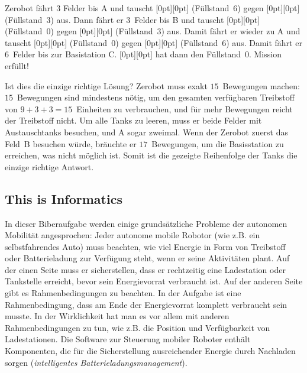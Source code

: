 \documentclass[a4paper,11pt]{report}
\newcommand{\taskGraphicsFolder}{..}
\begin{document}
Zerobot fährt $3$ Felder bis A und tauscht \raisebox{-0.5ex}[0pt][0pt]{} (Füllstand~$6$) gegen \raisebox{-0.5ex}[0pt][0pt]{} (Füllstand~$3$) aus. Dann fährt er $3$~Felder bis B und tauscht \raisebox{-0.5ex}[0pt][0pt]{} (Füllstand~$0$) gegen \raisebox{-0.5ex}[0pt][0pt]{} (Füllstand~$3$) aus. Damit fährt er wieder zu A und tauscht \raisebox{-0.5ex}[0pt][0pt]{} (Füllstand~$0$) gegen \raisebox{-0.5ex}[0pt][0pt]{} (Füllstand~$6$) aus. Damit fährt er $6$~Felder bis zur Basistation C. \raisebox{-0.5ex}[0pt][0pt]{} hat dann den Füllstand~$0$. Mission erfüllt!

Ist dies die einzige richtige Lösung? Zerobot muss exakt $15$~Bewegungen machen: $15$~Bewegungen sind mindestens nötig, um den gesamten verfügbaren Treibstoff von ${9 + 3 + 3 = 15}$~Einheiten zu verbrauchen, und für mehr Bewegungen reicht der Treibstoff nicht. Um alle Tanks zu leeren, muss er beide Felder mit Austauschtanks besuchen, und A sogar zweimal. Wenn der Zerobot zuerst das Feld~B besuchen würde, bräuchte er $17$~Bewegungen, um die Basisstation zu erreichen, was nicht möglich ist. Somit ist die gezeigte Reihenfolge der Tanks die einzige richtige Antwort.


\subsection*{This is Informatics}

In dieser Biberaufgabe werden einige grundsätzliche Probleme der autonomen Mobilität angesprochen: Jeder autonome mobile Robotor (wie z.B. ein selbstfahrendes Auto) muss beachten, wie viel Energie in Form von Treibstoff oder Batterieladung zur Verfügung steht, wenn er seine Aktivitäten plant. Auf der einen Seite muss er sicherstellen, dass er rechtzeitig eine Ladestation oder Tankstelle erreicht, bevor sein Energievorrat verbraucht ist. Auf der anderen Seite gibt es Rahmenbedingungen zu beachten. In der Aufgabe ist eine Rahmenbedingung, dass am Ende der Energievorrat komplett verbraucht sein musste. In der Wirklichkeit hat man es vor allem mit anderen Rahmenbedingungen zu tun, wie z.B. die Position und Verfügbarkeit von Ladestationen. Die Software zur Steuerung mobiler Roboter enthält Komponenten, die für die Sicherstellung ausreichender Energie durch Nachladen sorgen (\emph{intelligentes Batterieladungsmanagement}).
\end{document}
